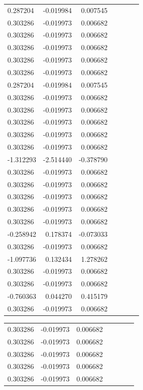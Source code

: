 \documentclass[a4paper,twoside,12pt]{book}
\begin{document}
\begin{appendices}
\begin{table}
\begin{tabular}{lrrrrrr}
	 0.287204 & -0.019984 &  0.007545 \\
	 0.303286 & -0.019973 &  0.006682 \\
	 0.303286 & -0.019973 &  0.006682 \\
	 0.303286 & -0.019973 &  0.006682 \\
	 0.303286 & -0.019973 &  0.006682 \\
	 0.303286 & -0.019973 &  0.006682 \\
	 0.287204 & -0.019984 &  0.007545 \\
	 0.303286 & -0.019973 &  0.006682 \\
	 0.303286 & -0.019973 &  0.006682 \\
	 0.303286 & -0.019973 &  0.006682 \\
	 0.303286 & -0.019973 &  0.006682 \\
	 0.303286 & -0.019973 &  0.006682 \\
	-1.312293 & -2.514440 & -0.378790 \\
	 0.303286 & -0.019973 &  0.006682 \\
	 0.303286 & -0.019973 &  0.006682 \\
	 0.303286 & -0.019973 &  0.006682 \\
	 0.303286 & -0.019973 &  0.006682 \\
	 0.303286 & -0.019973 &  0.006682 \\
	-0.258942 &  0.178374 & -0.073033 \\
	 0.303286 & -0.019973 &  0.006682 \\
	-1.097736 &  0.132434 &  1.278262 \\
	 0.303286 & -0.019973 &  0.006682 \\
	 0.303286 & -0.019973 &  0.006682 \\
	-0.760363 &  0.044270 &  0.415179 \\
	 0.303286 & -0.019973 &  0.006682 \\
	 \bottomrule
	\end{tabular}		
\end{table}
\begin{table}
	\centering
	\begin{tabular}{lrrrrrr}
		\toprule
	 0.303286 & -0.019973 &  0.006682 \\
	 0.303286 & -0.019973 &  0.006682 \\
	 0.303286 & -0.019973 &  0.006682 \\
	 0.303286 & -0.019973 &  0.006682 \\
	 0.303286 & -0.019973 &  0.006682 \\

\end{tabular}
\end{table}
\end{appendices}
\end{document}
